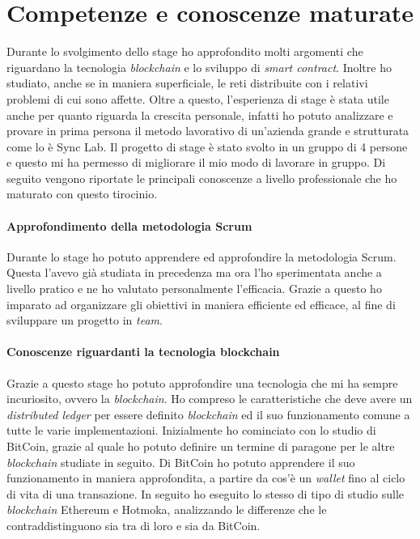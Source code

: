 
\section{Competenze e conoscenze maturate}
Durante lo svolgimento dello stage ho approfondito molti argomenti che riguardano la tecnologia \textit{blockchain} e lo sviluppo di \textit{smart contract}. Inoltre ho studiato, anche se in maniera superficiale, le reti distribuite con i relativi problemi di cui sono affette.
Oltre a questo, l'esperienza di stage è stata utile anche per quanto riguarda la crescita personale, infatti ho potuto analizzare e provare in prima persona il metodo lavorativo di un'azienda grande e strutturata come lo è Sync Lab. Il progetto di stage è stato svolto in un gruppo di 4 persone e questo mi ha permesso di migliorare il mio modo di lavorare in gruppo. 
Di seguito vengono riportate le principali conoscenze a livello professionale che ho maturato con questo tirocinio. 

\paragraph{Approfondimento della metodologia Scrum}
Durante lo stage ho potuto apprendere ed approfondire la metodologia Scrum. Questa l'avevo già studiata in precedenza ma ora l'ho sperimentata anche a livello pratico e ne ho valutato personalmente l'efficacia. Grazie a questo ho imparato ad organizzare gli obiettivi in maniera efficiente ed efficace, al fine di sviluppare un progetto in \textit{team}.

\paragraph{Conoscenze riguardanti la tecnologia blockchain} 
Grazie a questo stage ho potuto approfondire una tecnologia che mi ha sempre incuriosito, ovvero la \textit{blockchain}. Ho compreso le caratteristiche che deve avere un \textit{distributed ledger} per essere definito \textit{blockchain} ed il suo funzionamento comune a tutte le varie implementazioni. 
Inizialmente ho cominciato con lo studio di BitCoin, grazie al quale ho potuto definire un termine di paragone per le altre \textit{blockchain} studiate in seguito. Di BitCoin ho potuto apprendere il suo funzionamento in maniera approfondita, a partire da cos'è un \textit{wallet} fino al ciclo di vita di una transazione. In seguito ho eseguito lo stesso di tipo di studio sulle \textit{blockchain} Ethereum e Hotmoka, analizzando le differenze che le contraddistinguono sia tra di loro e sia da BitCoin. \\

